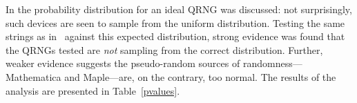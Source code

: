 \documentclass{mscs}
\begin{document}
In \citet{AbbottCalude10} the probability distribution for an ideal QRNG was discussed: not surprisingly, such devices are seen to sample from the uniform distribution.
Testing the same strings as in~\citet{PhysRevA.82.022102} against this expected distribution, strong evidence was found that the QRNGs tested are {\em not} sampling from the correct distribution. Further, weaker evidence suggests the pseudo-random sources of randomness---Mathematica and Maple---are, on the contrary, too normal. The results of the analysis are presented in Table~\ref{pvalues}.

\end{document}
